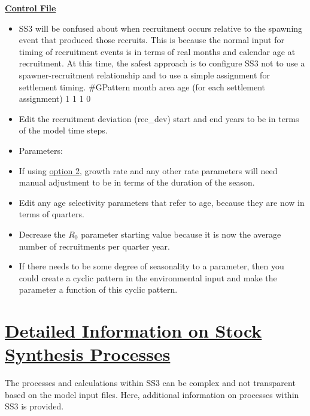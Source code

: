 \textbf{\underline{Control File}}
\begin{itemize}
	\item SS3 will be confused about when recruitment occurs relative to the spawning event that produced those recruits. This is because the normal input for timing of recruitment events is in terms of real months and calendar age at recruitment. At this time, the safest approach is to configure SS3 not to use a spawner-recruitment relationship and to use a simple assignment for settlement timing.
	\#GPattern month area age (for each settlement assignment)
	1         1     1    0
	\item Edit the recruitment deviation (rec\_dev) start and end years to be in terms of the model time steps.
	\item Parameters:
		\item If using \hyperlink{option2}{option 2}, growth rate and any other rate parameters will need manual adjustment to be in terms of the duration of the season.
		\item Edit any age selectivity parameters that refer to age, because they are now in terms of quarters.
		\item Decrease the $R_{0}$ parameter starting value because it is now the average number of recruitments per quarter year.
		\item If there needs to be some degree of seasonality to a parameter, then you could create a cyclic pattern in the environmental input and make the parameter a function of this cyclic pattern.
\end{itemize}

\pagebreak

\hypertarget{SS3Processes}{}
\section[Detailed Information on Stock Synthesis Processes]{\protect\hyperlink{SS3Processes}{Detailed Information on Stock Synthesis Processes}}

The processes and calculations within SS3 can be complex and not transparent based on the model input files. Here, additional information on processes within SS3 is provided.

